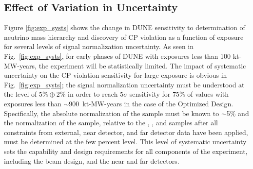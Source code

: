 \subsection{Effect of Variation in Uncertainty}
Figure \ref{fig:exp_systs} shows the
change in DUNE sensitivity to determination of
neutrino mass hierarchy and discovery of CP violation
as a function of exposure for several levels of signal normalization uncertainty.
As seen in Fig.~\ref{fig:exp_systs}, for early phases of DUNE
with exposures less than 100 kt-MW-years, the experiment
will be statistically limited.
The impact of systematic uncertainty on the CP violation sensitivity for large exposure
is obvious in Fig.~\ref{fig:exp_systs}; the \nue signal normalization uncertainty must
be understood at the level of $5\% \oplus 2\%$ in order to reach 5$\sigma$ sensitivity for
75\% of \deltacp values with exposures less than $\sim$900~kt-MW-years in the case of the
Optimized Design. Specifically, the absolute normalization of the \numu sample must be known to
$\sim$5\% and the normalization of the \nue sample,
relative to the \anue, \numu, and \anumu samples after all constraints from
external, near detector, and far detector data have been applied, must be determined 
at the few percent level. This level of systematic uncertainty sets the capability and
design requirements for all components of the experiment, including the beam design, and the
near and far detectors.
%
